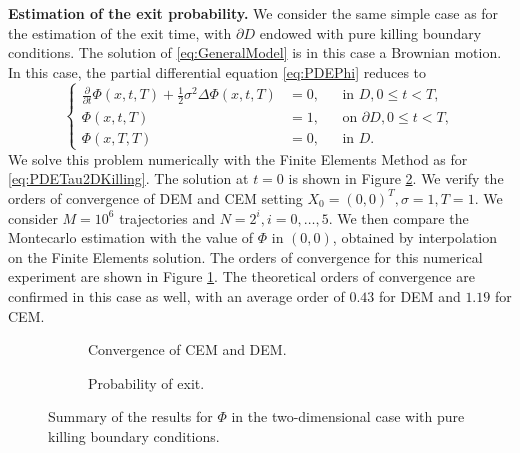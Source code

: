 
\vspace{2mm}
\noindent \textbf{Estimation of the exit probability.} We consider the same simple case as for the estimation of the exit time, with $\partial D$ endowed with pure killing boundary conditions. The solution of \eqref{eq:GeneralModel} is in this case a Brownian motion. In this case, the partial differential equation \eqref{eq:PDEPhi} reduces to
\begin{equation}\label{eq:PDEPhi2DKilling}
	\left \{
  	\begin{aligned}
	\frac{\partial}{\partial t} \Phi(x,t,T) + \frac{1}{2} \sigma^2 \Delta \Phi(x,t,T) &= 0, && \text{in } D, 0 \leq t < T,\\
	\Phi(x,t,T) &= 1, && \text{on } \partial D, 0 \leq t < T,\\
	\Phi(x,T,T) &= 0, && \text{in } D.
  	\end{aligned} \right.
\end{equation}
We solve this problem numerically with the Finite Elements Method as for \eqref{eq:PDETau2DKilling}. The solution at $t = 0$ is shown in Figure \ref{fig:PhiExact2DKill}. We verify the orders of convergence of DEM and CEM setting $X_0 = (0,0)^T , \sigma = 1, T = 1$. We consider $M = 10^6$ trajectories and $N = 2^i,i=0,\dots,5$. We then compare the Montecarlo estimation with the value of $\Phi$ in $(0,0)$, obtained by interpolation on the Finite Elements solution. The orders of convergence for this numerical experiment are shown in Figure \ref{fig:KillTwoDPhi}. The theoretical orders of convergence are confirmed in this case as well, with an average order of $0.43$ for DEM and $1.19$ for CEM.

\begin{figure}[t]
    \centering
    \begin{subfigure}{0.49\linewidth}
        \centering
        \resizebox{1\linewidth}{!}{ }  
        \caption{Convergence of CEM and DEM.}
        \label{fig:KillTwoDPhi}
    \end{subfigure}
    \begin{subfigure}{0.49\linewidth}
        \centering
        \resizebox{1\linewidth}{!}{ }  
        \caption{Probability of exit.}
        \label{fig:PhiExact2DKill}
    \end{subfigure}    
    \caption{Summary of the results for $\Phi$ in the two-dimensional case with pure killing boundary conditions.}
    \label{fig:OrdersTwoDKillPhi}
\end{figure}

